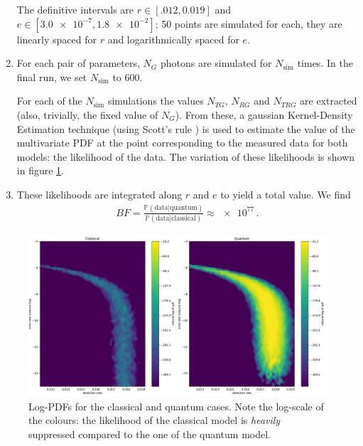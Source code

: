\documentclass[main.tex]{subfiles}
\begin{document}
\begin{enumerate}
    The definitive intervals are \(r \in [\num{.012}, \num{0.019}]\) and \(e \in [\num{3.0e-7}, \num{1.8e-2}]\); 50 points are simulated for each, they are linearly spaced for \(r\) and logarithmically spaced for \(e\). 
    \item For each pair of parameters, \(N_G\) photons are simulated for \(N _{\text{sim}}\) times. In the final run, we set \(N _{\text{sim}}\) to 600. 
    
    For each of the \(N _{\text{sim}}\) simulations the values \(N_{TG}\), \(N_{RG}\) and \(N_{TRG}\) are extracted (also, trivially, the fixed value of \(N_G\)). 
    From these, a gaussian Kernel-Density Estimation technique (using Scott's rule \cite[]{scipycontributorsScipyStatsGaussian2019,scottMultivariateDensityEstimation2015}) is used to estimate the value of the multivariate PDF at the point corresponding to the measured data for both models: the likelihood of the data.
    The variation of these likelihoods is shown in figure \ref{fig:both_logpdfs}. 
    \item These likelihoods are integrated along \(r\) and \(e\) to yield a total value. We find 
    \begin{align}
    BF = \frac{\mathbb{P}(\text{data} | \text{quantum})}{\mathbb{P}(\text{data} | \text{classical})}
    \approx \num{e77}
    \,.
    \end{align}
\end{enumerate}

\begin{figure}[ht]
\centering
\includegraphics[width=\textwidth]{figures/both_logpdfs}
\caption{Log-PDFs for the classical and quantum cases. Note the log-scale of the colours: the likelihood of the classical model is \emph{heavily} suppressed compared to the one of the quantum model.}
\label{fig:both_logpdfs}
\end{figure}
\end{document}
